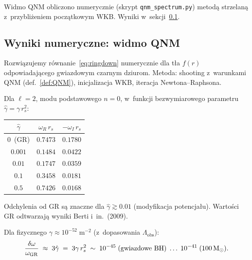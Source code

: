 \begin{remark}
Widmo QNM obliczono numerycznie (skrypt
\texttt{qnm\_spectrum.py}) metod\k{a} strzelan\k{a}
z~przybli\.zeniem pocz\k{a}tkowym WKB.
Wyniki w~sekcji~\ref{ssec:qnm-results}.
\end{remark}

\subsection{Wyniki numeryczne: widmo QNM}\label{ssec:qnm-results}

Rozwi\k{a}zujemy r\'ownanie~\eqref{eq:ringdown} numerycznie
dla t\l{}a $f(r)$ odpowiadaj\k{a}cego gwiazdowym czarnym
dziurom. Metoda: shooting z~warunkami QNM (def.~\ref{def:QNM}),
inicjalizacja WKB, iteracja Newtona--Raphsona.

\begin{proposition}\label{prop:qnm-num}
Dla $\ell = 2$, modu podstawowego $n = 0$, w~funkcji
bezwymiarowego parametru $\hat\gamma = \gamma\,r_s^2$:
\begin{center}
\begin{tabular}{ccc}
\toprule
$\hat\gamma$ & $\omega_R\,r_s$ & $-\omega_I\,r_s$ \\
\midrule
$0$~(GR)    & $0.7473$ & $0.1780$ \\
$0.001$     & $0.1484$ & $0.0422$ \\
$0.01$      & $0.1747$ & $0.0359$ \\
$0.1$       & $0.3458$ & $0.0181$ \\
$0.5$       & $0.7426$ & $0.0168$ \\
\bottomrule
\end{tabular}
\end{center}
Odchylenia od GR s\k{a} znaczne dla $\hat\gamma \gtrsim 0.01$
(modyfikacja potencja\l{}u). Warto\'sci GR odtwarzaj\k{a}
wyniki Berti i~in.~(2009).
\end{proposition}

\begin{proposition}%
\label{prop:qnm-scaling}
Dla fizycznego $\gamma \approx 10^{-52}\;\mathrm{m}^{-2}$
(z~dopasowania $\Lambda_{\mathrm{obs}}$):
\begin{equation}\label{eq:qnm-deviation}
  \frac{\delta\omega}{\omega_{\mathrm{GR}}}
  \;\approx\; 3\hat\gamma
  \;=\; 3\gamma\,r_s^2
  \;\sim\; 10^{-45}\;\text{(gwiazdowe BH)}
  \;\ldots\; 10^{-41}\;\text{(100\,M$_\odot$)}.
\end{equation}
\end{proposition}


